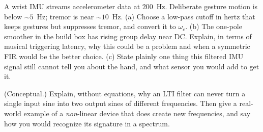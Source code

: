 \begin{exercise}
A wrist IMU streams accelerometer data at $200$~Hz. Deliberate gesture motion is
below $\sim 5$~Hz; tremor is near $\sim 10$~Hz. (a) Choose a low-pass cutoff in
hertz that keeps gestures but suppresses tremor, and convert it to $\omega_c$.
(b) The one-pole smoother in the build box has rising group delay near DC.
Explain, in terms of musical triggering latency, why this could be a problem and
when a symmetric FIR would be the better choice. (c) State plainly one thing this
filtered IMU signal still cannot tell you about the hand, and what sensor you
would add to get it.
\end{exercise}

\begin{exercise}
(Conceptual.) Explain, without equations, why an LTI filter can never turn a
single input sine into two output sines of different frequencies. Then give a
real-world example of a \emph{non}-linear device that does create new frequencies,
and say how you would recognize its signature in a spectrum.
\end{exercise}

